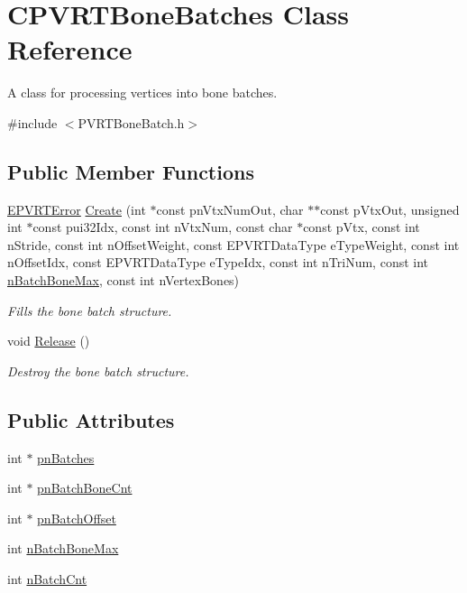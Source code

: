 \hypertarget{class_c_p_v_r_t_bone_batches}{\section{C\+P\+V\+R\+T\+Bone\+Batches Class Reference}
\label{class_c_p_v_r_t_bone_batches}
}


A class for processing vertices into bone batches.  




{\ttfamily \#include $<$P\+V\+R\+T\+Bone\+Batch.\+h$>$}

\subsection*{Public Member Functions}
\begin{DoxyCompactItemize}
\item 
\hyperlink{_p_v_r_t_error_8h_a9e837ff1a83f3a5f332bc4cc78454608}{E\+P\+V\+R\+T\+Error} \hyperlink{class_c_p_v_r_t_bone_batches_a2a0037ba145fbb78e013867effaa1764}{Create} (int $\ast$const pn\+Vtx\+Num\+Out, char $\ast$$\ast$const p\+Vtx\+Out, unsigned int $\ast$const pui32\+Idx, const int n\+Vtx\+Num, const char $\ast$const p\+Vtx, const int n\+Stride, const int n\+Offset\+Weight, const E\+P\+V\+R\+T\+Data\+Type e\+Type\+Weight, const int n\+Offset\+Idx, const E\+P\+V\+R\+T\+Data\+Type e\+Type\+Idx, const int n\+Tri\+Num, const int \hyperlink{class_c_p_v_r_t_bone_batches_af9b116c78dee953c533d4476418ad621}{n\+Batch\+Bone\+Max}, const int n\+Vertex\+Bones)
\begin{DoxyCompactList}\small\item\em Fills the bone batch structure. \end{DoxyCompactList}\item 
void \hyperlink{class_c_p_v_r_t_bone_batches_a3282990401eae2cf95c8170c7626230d}{Release} ()
\begin{DoxyCompactList}\small\item\em Destroy the bone batch structure. \end{DoxyCompactList}\end{DoxyCompactItemize}
\subsection*{Public Attributes}
\begin{DoxyCompactItemize}
\item 
int $\ast$ \hyperlink{class_c_p_v_r_t_bone_batches_ad28f537c414b9f867ff7e97a2518ba2b}{pn\+Batches}
\item 
int $\ast$ \hyperlink{class_c_p_v_r_t_bone_batches_ae48f5f82f69a2bf19134aafdbb7b82f6}{pn\+Batch\+Bone\+Cnt}
\item 
int $\ast$ \hyperlink{class_c_p_v_r_t_bone_batches_a528439f662d00c261ae6344c5158bd69}{pn\+Batch\+Offset}
\item 
int \hyperlink{class_c_p_v_r_t_bone_batches_af9b116c78dee953c533d4476418ad621}{n\+Batch\+Bone\+Max}
\item 
int \hyperlink{class_c_p_v_r_t_bone_batches_aa153761d4db66658f734a3d3ca649b05}{n\+Batch\+Cnt}
\end{DoxyCompactItemize}


